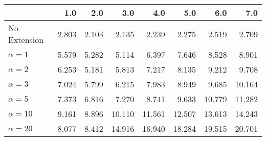 \begin{tabular}{lrrrrrrr}
\toprule
{} &   1.0 &   2.0 &    3.0 &    4.0 &    5.0 &    6.0 &    7.0 \\
\midrule
No Extension  & 2.803 & 2.103 &  2.135 &  2.239 &  2.275 &  2.519 &  2.709 \\
$\alpha = 1$  & 5.579 & 5.282 &  5.114 &  6.397 &  7.646 &  8.528 &  8.901 \\
$\alpha = 2$  & 6.253 & 5.181 &  5.813 &  7.217 &  8.135 &  9.212 &  9.708 \\
$\alpha = 3$  & 7.024 & 5.799 &  6.215 &  7.983 &  8.949 &  9.685 & 10.164 \\
$\alpha = 5$  & 7.373 & 6.816 &  7.270 &  8.741 &  9.633 & 10.779 & 11.282 \\
$\alpha = 10$ & 9.161 & 8.896 & 10.110 & 11.561 & 12.507 & 13.613 & 14.243 \\
$\alpha = 20$ & 8.077 & 8.412 & 14.916 & 16.940 & 18.284 & 19.515 & 20.701 \\
\bottomrule
\end{tabular}
